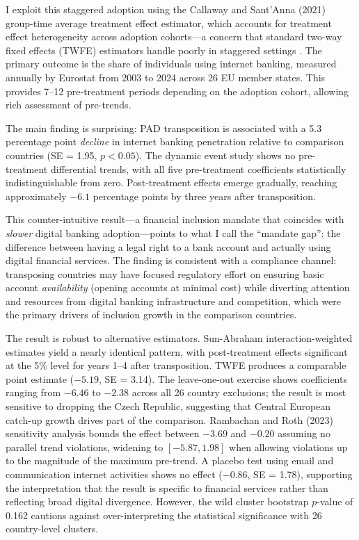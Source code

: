 \documentclass[12pt]{article}
\begin{document}
I exploit this staggered adoption using the Callaway and Sant'Anna (2021) group-time average treatment effect estimator, which accounts for treatment effect heterogeneity across adoption cohorts---a concern that standard two-way fixed effects (TWFE) estimators handle poorly in staggered settings \citep{goodman2021difference, sun2021estimating, dechaisemartin2020two}. The primary outcome is the share of individuals using internet banking, measured annually by Eurostat from 2003 to 2024 across 26 EU member states. This provides 7--12 pre-treatment periods depending on the adoption cohort, allowing rich assessment of pre-trends.

The main finding is surprising: PAD transposition is associated with a 5.3 percentage point \emph{decline} in internet banking penetration relative to comparison countries (SE = 1.95, $p < 0.05$). The dynamic event study shows no pre-treatment differential trends, with all five pre-treatment coefficients statistically indistinguishable from zero. Post-treatment effects emerge gradually, reaching approximately $-6.1$ percentage points by three years after transposition.

This counter-intuitive result---a financial inclusion mandate that coincides with \emph{slower} digital banking adoption---points to what I call the ``mandate gap'': the difference between having a legal right to a bank account and actually using digital financial services. The finding is consistent with a compliance channel: transposing countries may have focused regulatory effort on ensuring basic account \emph{availability} (opening accounts at minimal cost) while diverting attention and resources from digital banking infrastructure and competition, which were the primary drivers of inclusion growth in the comparison countries.

The result is robust to alternative estimators. Sun-Abraham interaction-weighted estimates yield a nearly identical pattern, with post-treatment effects significant at the 5\% level for years 1--4 after transposition. TWFE produces a comparable point estimate ($-5.19$, SE = 3.14). The leave-one-out exercise shows coefficients ranging from $-6.46$ to $-2.38$ across all 26 country exclusions; the result is most sensitive to dropping the Czech Republic, suggesting that Central European catch-up growth drives part of the comparison. Rambachan and Roth (2023) sensitivity analysis bounds the effect between $-3.69$ and $-0.20$ assuming no parallel trend violations, widening to $[-5.87, 1.98]$ when allowing violations up to the magnitude of the maximum pre-trend. A placebo test using email and communication internet activities shows no effect ($-0.86$, SE = 1.78), supporting the interpretation that the result is specific to financial services rather than reflecting broad digital divergence. However, the wild cluster bootstrap $p$-value of 0.162 cautions against over-interpreting the statistical significance with 26 country-level clusters.
\end{document}
